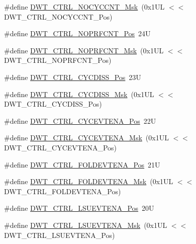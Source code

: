 \begin{DoxyCompactItemize}
\item 
\#define \mbox{\hyperlink{group___c_m_s_i_s___d_w_t_gaf40c8d7a4fd978034c137e90f714c143}{D\+W\+T\+\_\+\+C\+T\+R\+L\+\_\+\+N\+O\+C\+Y\+C\+C\+N\+T\+\_\+\+Msk}}~(0x1\+U\+L $<$$<$ D\+W\+T\+\_\+\+C\+T\+R\+L\+\_\+\+N\+O\+C\+Y\+C\+C\+N\+T\+\_\+\+Pos)
\item 
\#define \mbox{\hyperlink{group___c_m_s_i_s___d_w_t_gad52a0e5be84363ab166cc17beca0d048}{D\+W\+T\+\_\+\+C\+T\+R\+L\+\_\+\+N\+O\+P\+R\+F\+C\+N\+T\+\_\+\+Pos}}~24U
\item 
\#define \mbox{\hyperlink{group___c_m_s_i_s___d_w_t_gafd8448d7db4bc51f27f202e6e1f27823}{D\+W\+T\+\_\+\+C\+T\+R\+L\+\_\+\+N\+O\+P\+R\+F\+C\+N\+T\+\_\+\+Msk}}~(0x1\+U\+L $<$$<$ D\+W\+T\+\_\+\+C\+T\+R\+L\+\_\+\+N\+O\+P\+R\+F\+C\+N\+T\+\_\+\+Pos)
\item 
\#define \mbox{\hyperlink{group___c_m_s_i_s___d_w_t_ga555f3a6b0510368a2bba4f0e06e559c3}{D\+W\+T\+\_\+\+C\+T\+R\+L\+\_\+\+C\+Y\+C\+D\+I\+S\+S\+\_\+\+Pos}}~23U
\item 
\#define \mbox{\hyperlink{group___c_m_s_i_s___d_w_t_ga688a3b9ecd2a044f2da3280367476271}{D\+W\+T\+\_\+\+C\+T\+R\+L\+\_\+\+C\+Y\+C\+D\+I\+S\+S\+\_\+\+Msk}}~(0x1\+U\+L $<$$<$ D\+W\+T\+\_\+\+C\+T\+R\+L\+\_\+\+C\+Y\+C\+D\+I\+S\+S\+\_\+\+Pos)
\item 
\#define \mbox{\hyperlink{group___c_m_s_i_s___d_w_t_ga0cb0640aaeb18a626d7823570d5c3cb6}{D\+W\+T\+\_\+\+C\+T\+R\+L\+\_\+\+C\+Y\+C\+E\+V\+T\+E\+N\+A\+\_\+\+Pos}}~22U
\item 
\#define \mbox{\hyperlink{group___c_m_s_i_s___d_w_t_ga40554bd81460e39abf08810f45fac1a2}{D\+W\+T\+\_\+\+C\+T\+R\+L\+\_\+\+C\+Y\+C\+E\+V\+T\+E\+N\+A\+\_\+\+Msk}}~(0x1\+U\+L $<$$<$ D\+W\+T\+\_\+\+C\+T\+R\+L\+\_\+\+C\+Y\+C\+E\+V\+T\+E\+N\+A\+\_\+\+Pos)
\item 
\#define \mbox{\hyperlink{group___c_m_s_i_s___d_w_t_ga5602b0707f446ce78d88ff2a3a82bfff}{D\+W\+T\+\_\+\+C\+T\+R\+L\+\_\+\+F\+O\+L\+D\+E\+V\+T\+E\+N\+A\+\_\+\+Pos}}~21U
\item 
\#define \mbox{\hyperlink{group___c_m_s_i_s___d_w_t_ga717e679d775562ae09185a3776b1582f}{D\+W\+T\+\_\+\+C\+T\+R\+L\+\_\+\+F\+O\+L\+D\+E\+V\+T\+E\+N\+A\+\_\+\+Msk}}~(0x1\+U\+L $<$$<$ D\+W\+T\+\_\+\+C\+T\+R\+L\+\_\+\+F\+O\+L\+D\+E\+V\+T\+E\+N\+A\+\_\+\+Pos)
\item 
\#define \mbox{\hyperlink{group___c_m_s_i_s___d_w_t_gaea5d1ee72188dc1d57b54c60a9f5233e}{D\+W\+T\+\_\+\+C\+T\+R\+L\+\_\+\+L\+S\+U\+E\+V\+T\+E\+N\+A\+\_\+\+Pos}}~20U
\item 
\#define \mbox{\hyperlink{group___c_m_s_i_s___d_w_t_gac47427f455fbc29d4b6f8a479169f2b2}{D\+W\+T\+\_\+\+C\+T\+R\+L\+\_\+\+L\+S\+U\+E\+V\+T\+E\+N\+A\+\_\+\+Msk}}~(0x1\+U\+L $<$$<$ D\+W\+T\+\_\+\+C\+T\+R\+L\+\_\+\+L\+S\+U\+E\+V\+T\+E\+N\+A\+\_\+\+Pos)

\end{DoxyCompactItemize}
